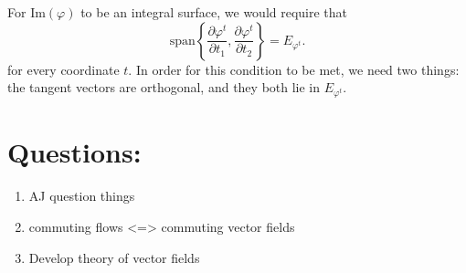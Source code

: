 \documentclass{lkx_paper}
\begin{document}
For $\textrm{Im}(\varphi)$ to be an integral surface, we would require that
\[
	\textrm{span}\left\{\frac{\partial \varphi^t}{\partial t_1}, \frac{\partial \varphi^t}{\partial t_2}\right\} = E_{\varphi^t}.
\]
for every coordinate $t$. In order for this condition to be met, we need two things: the tangent vectors are orthogonal, and they both lie in $E_{\varphi^t}$.

%

\section*{Questions:}

\begin{enumerate}
	\item AJ question things
	\item commuting flows <=> commuting vector fields
	\item Develop theory of vector fields
\end{enumerate}
\end{document}
